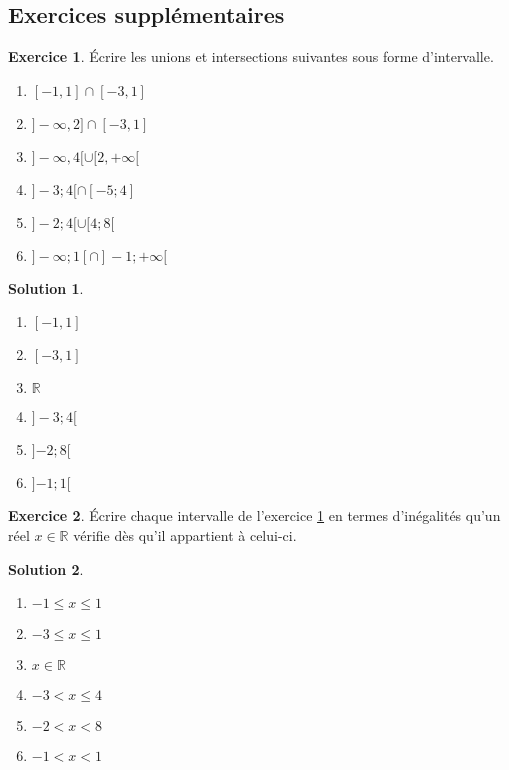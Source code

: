\documentclass[a4paper, 14pt]{extarticle}
\theoremstyle{plain}
\newtheorem*{sol}{Solution}
\theoremstyle{definition}
\newtheorem{ex}{Exercice}
\newcommand{\R}{\mathbb{R}}
\newcommand{\exe}[2]{
		\begin{ex} #1  \end{ex}
		\begin{sol} #2 \end{sol}
	}
\newcommand{\exe}[2]{
		\begin{ex} #1  \end{ex}
	}
\begin{document}
\newpage
\subsection*{Exercices supplémentaires}

\exe{\label{ex:2}
	Écrire les unions et intersections suivantes sous forme d'intervalle.
	
	
	\begin{multicols}{2}
	\begin{enumerate}
		\item $[-1,1] \cap [-3, 1]$
		\item $]{-}\infty, 2] \cap [-3, 1]$
		\item $]{-}\infty, 4 [ \cup [2, +\infty[$
		\item $] {-}3 ; 4 [ \cap [-5 ; 4]$
		\item $]{-}2 ; 4 [  \cup [4 ; 8[$
		\item $ ]{-}\infty ; 1 [ \cap ]{-}1 ; +\infty [$
	\end{enumerate}
	\end{multicols}
}
{

	\begin{multicols}{2}
	\begin{enumerate}
		\item $[-1,1]$
		\item $[-3, 1]$
		\item $\R$
		\item $]{-}3 ; 4[$
		\item $]{-2} ; 8[$
		\item $]{-1};1[$
	\end{enumerate}
	\end{multicols}


}


\exe{
	Écrire chaque intervalle de l'exercice \ref{ex:2} en termes d'inégalités qu'un réel $x \in \R$ vérifie dès qu'il appartient à celui-ci.
}
{
	\begin{multicols}{2}
	\begin{enumerate}
		\item $-1 \leq x \leq 1$
		\item $-3 \leq x \leq 1$
		\item $x \in \R$
		\item $-3 < x \leq 4$
		\item $-2 < x < 8$
		\item $-1 < x < 1$
	\end{enumerate}
	\end{multicols}
}
\end{document}
